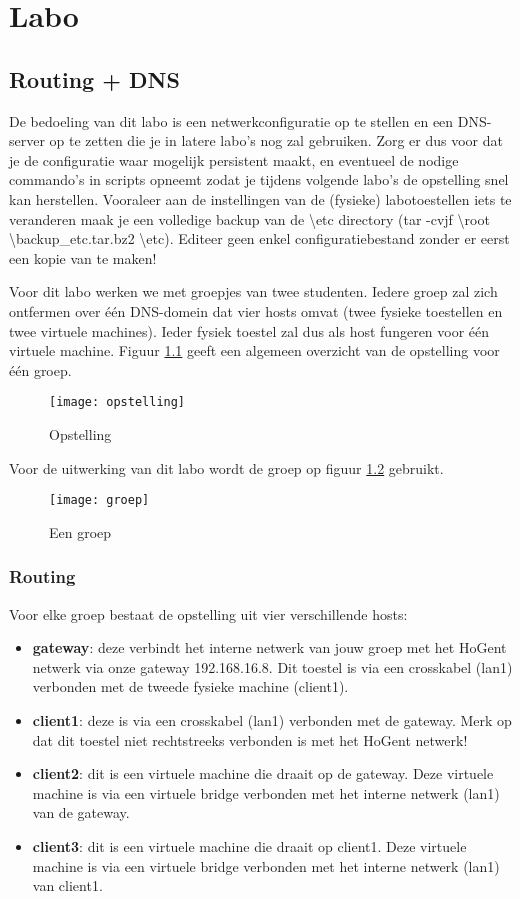 \documentclass{report}
\begin{document}
	\part{Labo}
	\chapter{Routing + DNS}
	De bedoeling van dit labo is een netwerkconfiguratie op te stellen en een DNS-server op te zetten die je in latere labo's nog zal gebruiken. Zorg er dus voor dat je de configuratie waar mogelijk persistent maakt, en eventueel de nodige commando's in scripts opneemt zodat je tijdens volgende labo's de opstelling snel kan herstellen.  Vooraleer aan de instellingen van de (fysieke) labotoestellen iets te veranderen maak je een volledige backup van de \textbackslash etc directory (tar -cvjf \textbackslash root \textbackslash backup\_etc.tar.bz2 \textbackslash etc).
	Editeer geen enkel configuratiebestand zonder er eerst een kopie van te maken!
	
	Voor dit labo werken we met groepjes van twee studenten. Iedere groep zal zich ontfermen over één DNS-domein dat vier hosts omvat (twee fysieke toestellen en twee virtuele machines). Ieder fysiek toestel zal dus als host fungeren voor één virtuele machine. Figuur \ref{fig:opstelling} geeft een algemeen overzicht van de opstelling voor één groep.
	\begin{figure}
		\texttt{[image: opstelling]}
		\caption{Opstelling}
		\label{fig:opstelling}
	\end{figure}
	Voor de uitwerking van dit labo wordt de groep op figuur \ref{fig:groep} gebruikt.
	\begin{figure}
		\texttt{[image: groep]}
		\caption{Een groep}
		\label{fig:groep}
	\end{figure}
\section{Routing}
 Voor elke groep bestaat de opstelling uit vier verschillende hosts:
\begin{itemize}
	\item \textbf{gateway}: deze verbindt het interne netwerk van jouw groep met het HoGent netwerk via onze gateway 192.168.16.8. Dit toestel is via een crosskabel (lan1) verbonden met de tweede fysieke machine (client1).
	\item \textbf{client1}: deze is via een crosskabel (lan1) verbonden met de gateway. Merk op dat dit toestel niet rechtstreeks verbonden is met het HoGent netwerk!
	\item \textbf{client2}: dit is een virtuele machine die draait op de gateway. Deze virtuele machine is via een virtuele bridge verbonden met het interne netwerk (lan1) van de gateway.
	\item \textbf{client3}: dit is een virtuele machine die draait op client1. Deze virtuele machine is via een virtuele bridge verbonden met het interne netwerk (lan1) van client1.
	
\end{itemize}
\end{document}
